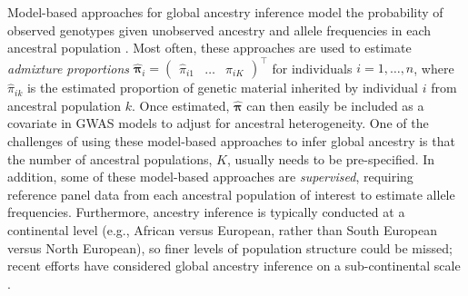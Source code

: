 \documentclass[12pt]{article}
\begin{document}
Model-based approaches for global ancestry inference model the probability of observed genotypes given unobserved ancestry and allele frequencies in each ancestral population \citep{structure, tang2005, admixture, finestructure}. 
Most often, these approaches are used to estimate \textit{admixture proportions} $\hat{\boldsymbol\pi}_i = \begin{pmatrix} \hat\pi_{i1} & \dots & \pi_{iK}  \end{pmatrix}^\top$ for individuals $i = 1, \dots, n$, where $\hat\pi_{ik}$ is the estimated proportion of genetic material inherited by individual $i$ from ancestral population $k$. 
Once estimated, $\hat{\boldsymbol\pi}$ can then easily be included as a covariate in GWAS models to adjust for ancestral heterogeneity.
One of the challenges of using these model-based approaches to infer global ancestry is that the number of ancestral populations, $K$, usually needs to be pre-specified. 
In addition, some of these model-based approaches are \textit{supervised}, requiring reference panel data from each ancestral population of interest to estimate allele frequencies.
Furthermore, ancestry inference is typically conducted at a continental level (e.g., African versus European, rather than South European versus North European), so finer levels of population structure could be missed; recent efforts have considered global ancestry inference on a sub-continental scale \citep{finestructure, durand2014}.
\end{document}
